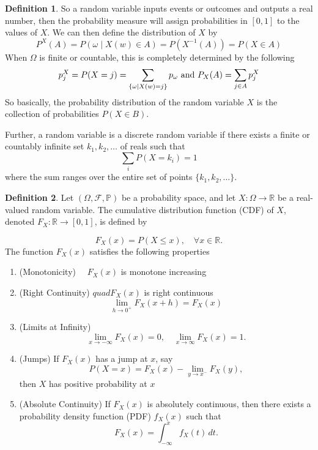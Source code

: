 \documentclass{article}
\theoremstyle{definition}
\newtheorem{definition}{Definition}[section]
\theoremstyle{remark}
\begin{document}
\begin{definition}
So a random variable inputs events or outcomes and outputs a real number, then the probability measure will assign probabilities in $[0,1]$ to the values of $X$.
We can then define the distribution of $X$ by
\[
P^X(A) = P({\omega \mid X(w) \in A}) = P(X^{-1}(A)) = P(X \in A)
\]
When $\Omega$ is finite or countable, this is completely determined by the following 
\[
p_j^X = P(X=j) = \sum_{\{\omega \mid X(w) =j\}}{p_\omega} \textnormal{ and } P_X(A) = \sum_{j \in A}{p^X_j}
\]
So basically, the probability distribution of the random variable $X$ is the collection
of probabilities $P(X\in B)$.
\par Further, a random variable is a discrete random variable if there exists
a finite or countably infinite set $k_1, k_2, \dots $ of reals such that
\[
\sum_i{P(X=k_i)} = 1
\]
where the sum ranges over the entire set of points $\{k_1, k_2, \dots\}$.
\end{definition}    





\begin{definition}
Let \( (\Omega, \mathcal{F}, \mathbb{P}) \) be a probability space, and let \( X: \Omega \to \mathbb{R} \) be a real-valued random variable. The cumulative distribution function (CDF) of \( X \), denoted \( F_X: \mathbb{R} \to [0,1] \), is defined by  

\[
F_X(x) = P(X \leq x), \quad \forall x \in \mathbb{R}.
\]
The function \( F_X(x) \) satisfies the following properties  
\begin{enumerate}
\item (Monotonicity) $\quad F_X(x)$ is monotone increasing
\item (Right Continuity) $quad F_X(x)$ is right continuous\[
\lim_{h\to 0^+} F_X(x+h) = F_X(x)
\]
\item (Limits at Infinity) \[
\lim_{x \to -\infty} F_X(x) = 0, \quad \lim_{x \to \infty} F_X(x) = 1.
\]  
\item (Jumps) If \( F_X(x) \) has a jump at \( x \), say  
\[
P(X = x) = F_X(x) - \lim_{y \to x^-} F_X(y),
\]  
then \( X \) has positive probability at \( x \)
\item (Absolute Continuity) If \( F_X(x) \) is absolutely continuous, then there exists a probability density function (PDF) \( f_X(x) \) such that  
\[
F_X(x) = \int_{-\infty}^{x} f_X(t) \, dt.
\]  
\end{enumerate} 
\end{definition}
\end{document}
